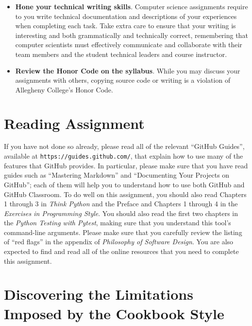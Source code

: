 \documentclass[11pt]{article}
\newcommand{\philosophy}{{\em Philosophy of Software Design\/}}
\newcommand{\pytest}{{\em Python Testing with Pytest\/}}
\newcommand{\url}[1]{\lstinline{#1}}
\begin{document}
\begin{itemize}
\item {\bf Hone your technical writing skills}. Computer science assignments
  require to you write technical documentation and descriptions of your
  experiences when completing each task. Take extra care to ensure that your
  writing is interesting and both grammatically and technically correct,
  remembering that computer scientists must effectively communicate and
  collaborate with their team members and the student technical leaders and
  course instructor.

\item {\bf Review the Honor Code on the syllabus}. While you may discuss your
  assignments with others, copying source code or writing is a violation of
  Allegheny College's Honor Code.

\end{itemize}

\section*{Reading Assignment}

If you have not done so already, please read all of the relevant ``GitHub
Guides'', available at \url{https://guides.github.com/}, that explain how to use
many of the features that GitHub provides. In particular, please make sure that
you have read guides such as ``Mastering Markdown'' and ``Documenting Your
Projects on GitHub''; each of them will help you to understand how to use both
GitHub and GitHub Classroom. To do well on this assignment, you should also read
Chapters 1 through 3 in {\em Think Python\/} and the Preface and Chapters 1
through 4 in the {\em Exercises in Programming Style\/}.
%
You should also read the first two chapters in the \pytest, making sure that you
understand this tool's command-line arguments.
%
Please make sure that you carefully review the listing of ``red flags'' in the
appendix of \philosophy.
%
You are also expected to find and read all of the online resources that you need
to complete this assignment.

\section*{Discovering the Limitations Imposed by the Cookbook Style}
\end{document}
